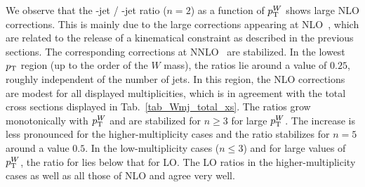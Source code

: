 We observe that the \Wmjj-jet / \Wmj-jet ratio ($n=2$) as a function of $p_{\textrm T}^W$ shows large NLO corrections. This is mainly due to the large corrections
appearing at NLO~\cite{Rubin:2010xp}, which are related to the release of a kinematical constraint as described in the previous sections. The corresponding corrections at
NNLO~\cite{Boughezal:2015dva,Boughezal:2015ded,Gehrmann-DeRidder:2016zml}
are stabilized. In the lowest $p_{\textrm T}$ region (up to the order of the
$W$ mass), the ratios lie around a value of $0.25$, roughly independent of the
number of jets. In this region, the NLO corrections are modest for all
displayed multiplicities, which is in agreement with the total cross sections displayed in
Tab.~\ref{tab_Wmj_total_xs}. The ratios grow monotonically with $p_{\textrm T}^W$ and are stabilized for $n\geq 3$ for large $p_{\textrm T}^W$. The increase is
less pronounced for the higher-multiplicity cases and the ratio stabilizes for $n=5$ around a value
$0.5$. In the low-multiplicity cases ($n\leq 3$) and for large values of $p_{\textrm T}^W$, the ratio for
\MILOp{} lies below that for LO. The LO ratios in the higher-multiplicity
cases as well
as all those of NLO and \MINLOp{} agree very well. 
